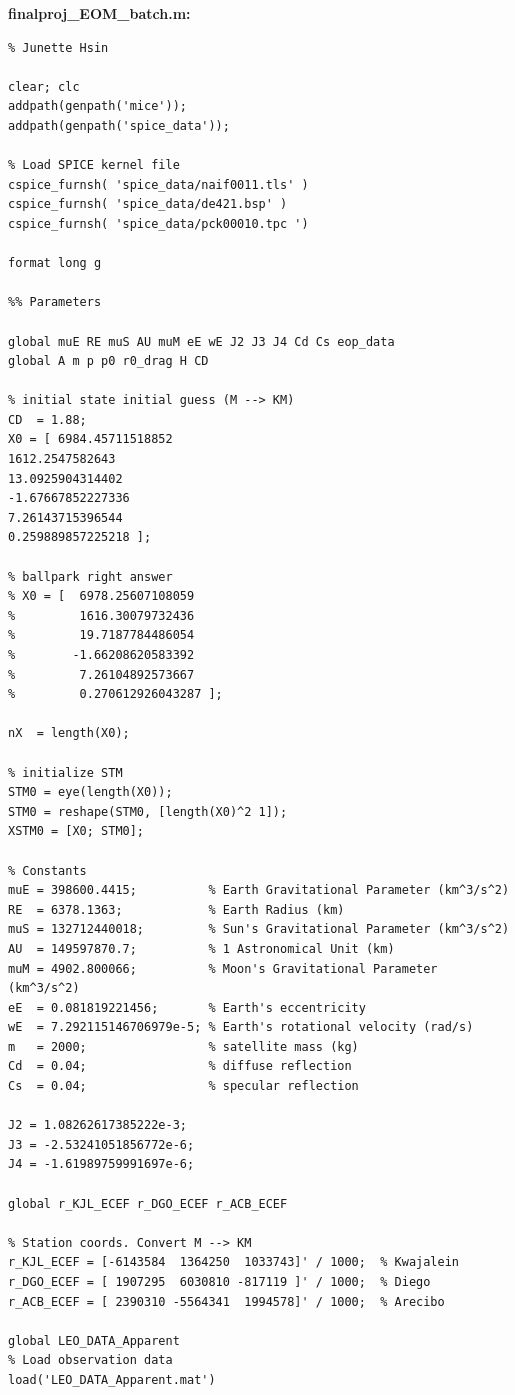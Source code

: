 \documentclass[conf]{new-aiaa}
\begin{document}
\textbf{finalproj\_EOM\_batch.m:}
\begin{lstlisting}[basicstyle=\footnotesize]
% HW 5 
% Junette Hsin 

clear; clc 
addpath(genpath('mice')); 
addpath(genpath('spice_data')); 

% Load SPICE kernel file 
cspice_furnsh( 'spice_data/naif0011.tls' )
cspice_furnsh( 'spice_data/de421.bsp' )       
cspice_furnsh( 'spice_data/pck00010.tpc ') 

format long g 

%% Parameters 

global muE RE muS AU muM eE wE J2 J3 J4 Cd Cs eop_data 
global A m p p0 r0_drag H CD

% initial state initial guess (M --> KM)
CD  = 1.88;    
X0 = [ 6984.45711518852 
1612.2547582643 
13.0925904314402 
-1.67667852227336
7.26143715396544
0.259889857225218 ]; 

% ballpark right answer 
% X0 = [  6978.25607108059
%         1616.30079732436
%         19.7187784486054
%        -1.66208620583392
%         7.26104892573667
%         0.270612926043287 ]; 

nX  = length(X0); 

% initialize STM 
STM0 = eye(length(X0)); 
STM0 = reshape(STM0, [length(X0)^2 1]); 
XSTM0 = [X0; STM0];  

% Constants 
muE = 398600.4415;          % Earth Gravitational Parameter (km^3/s^2) 
RE  = 6378.1363;            % Earth Radius (km)
muS = 132712440018;         % Sun's Gravitational Parameter (km^3/s^2)
AU  = 149597870.7;          % 1 Astronomical Unit (km)
muM = 4902.800066;          % Moon's Gravitational Parameter (km^3/s^2)
eE  = 0.081819221456;       % Earth's eccentricity 
wE  = 7.292115146706979e-5; % Earth's rotational velocity (rad/s)
m   = 2000;                 % satellite mass (kg) 
Cd  = 0.04;                 % diffuse reflection 
Cs  = 0.04;                 % specular reflection 

J2 = 1.08262617385222e-3; 
J3 = -2.53241051856772e-6;
J4 = -1.61989759991697e-6; 

global r_KJL_ECEF r_DGO_ECEF r_ACB_ECEF 

% Station coords. Convert M --> KM 
r_KJL_ECEF = [-6143584  1364250  1033743]' / 1000;  % Kwajalein 
r_DGO_ECEF = [ 1907295  6030810 -817119 ]' / 1000;  % Diego 
r_ACB_ECEF = [ 2390310 -5564341  1994578]' / 1000;  % Arecibo 

global LEO_DATA_Apparent 
% Load observation data 
load('LEO_DATA_Apparent.mat') 


\end{lstlisting}
\end{document}
